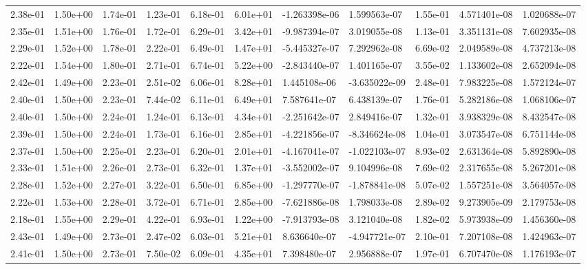 \begin{longtable}{| p{} | p{} |}
2.38e-01 & 1.50e+00 & 1.74e-01 & 1.23e-01 & 6.18e-01 & 6.01e+01 & -1.263398e-06 &  1.599563e-07 &  1.55e-01 &  4.571401e-08 &  1.020688e-07 \\
2.35e-01 & 1.51e+00 & 1.76e-01 & 1.72e-01 & 6.29e-01 & 3.42e+01 & -9.987394e-07 &  3.019055e-08 &  1.13e-01 &  3.351131e-08 &  7.602935e-08 \\
2.29e-01 & 1.52e+00 & 1.78e-01 & 2.22e-01 & 6.49e-01 & 1.47e+01 & -5.445327e-07 &  7.292962e-08 &  6.69e-02 &  2.049589e-08 &  4.737213e-08 \\
2.22e-01 & 1.54e+00 & 1.80e-01 & 2.71e-01 & 6.74e-01 & 5.22e+00 & -2.843440e-07 &  1.401165e-07 &  3.55e-02 &  1.133602e-08 &  2.652094e-08 \\
2.42e-01 & 1.49e+00 & 2.23e-01 & 2.51e-02 & 6.06e-01 & 8.28e+01 &  1.445108e-06 & -3.635022e-09 &  2.48e-01 &  7.983225e-08 &  1.572124e-07 \\
2.40e-01 & 1.50e+00 & 2.23e-01 & 7.44e-02 & 6.11e-01 & 6.49e+01 &  7.587641e-07 &  6.438139e-07 &  1.76e-01 &  5.282186e-08 &  1.068106e-07 \\
2.40e-01 & 1.50e+00 & 2.24e-01 & 1.24e-01 & 6.13e-01 & 4.34e+01 & -2.251642e-07 &  2.849416e-07 &  1.32e-01 &  3.938329e-08 &  8.432547e-08 \\
2.39e-01 & 1.50e+00 & 2.24e-01 & 1.73e-01 & 6.16e-01 & 2.85e+01 & -4.221856e-07 & -8.346624e-08 &  1.04e-01 &  3.073547e-08 &  6.751144e-08 \\
2.37e-01 & 1.50e+00 & 2.25e-01 & 2.23e-01 & 6.20e-01 & 2.01e+01 & -4.167041e-07 & -1.022103e-07 &  8.93e-02 &  2.631364e-08 &  5.892890e-08 \\
2.33e-01 & 1.51e+00 & 2.26e-01 & 2.73e-01 & 6.32e-01 & 1.37e+01 & -3.552002e-07 &  9.104996e-08 &  7.69e-02 &  2.317655e-08 &  5.267201e-08 \\
2.28e-01 & 1.52e+00 & 2.27e-01 & 3.22e-01 & 6.50e-01 & 6.85e+00 & -1.297770e-07 & -1.878841e-08 &  5.07e-02 &  1.557251e-08 &  3.564057e-08 \\
2.22e-01 & 1.53e+00 & 2.28e-01 & 3.72e-01 & 6.71e-01 & 2.85e+00 & -7.621886e-08 &  1.798033e-08 &  2.89e-02 &  9.273905e-09 &  2.179753e-08 \\
2.18e-01 & 1.55e+00 & 2.29e-01 & 4.22e-01 & 6.93e-01 & 1.22e+00 & -7.913793e-08 &  3.121040e-08 &  1.82e-02 &  5.973938e-09 &  1.456360e-08 \\
2.43e-01 & 1.49e+00 & 2.73e-01 & 2.47e-02 & 6.03e-01 & 5.21e+01 &  8.636640e-07 & -4.947721e-07 &  2.10e-01 &  7.207108e-08 &  1.424963e-07 \\
2.41e-01 & 1.50e+00 & 2.73e-01 & 7.50e-02 & 6.09e-01 & 4.35e+01 &  7.398480e-07 &  2.956888e-07 &  1.97e-01 &  6.707470e-08 &  1.176193e-07 \\

\end{longtable}
